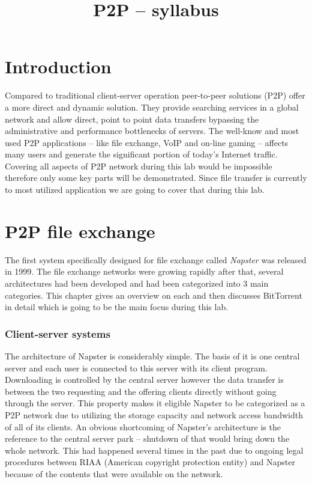 \documentclass[a4paper]{article}
\title{P2P – syllabus}
\author{}
\date{}
\begin{document}
\maketitle

\tableofcontents

\section{Introduction}

Compared to traditional client-server operation peer-to-peer solutions (P2P) offer a more direct and dynamic
solution. They provide searching services in a global network and allow direct, point to point data transfers
bypassing the administrative and performance bottlenecks of servers.
The well-know and most used P2P applications -- like file exchange, VoIP and on-line gaming -- affects many users and
generate the significant portion of today's Internet traffic. Covering all aspects of P2P network during this lab would
be impossible therefore only some key parts will be demonstrated. Since file transfer is currently to most utilized
application we are going to cover that during this lab.

\section{P2P file exchange}

The first system specifically designed for file exchange called \emph{Napster} was released in 1999. The file exchange
networks were growing rapidly after that, several architectures had been developed and had been categorized  into 3
main categories. This chapter gives an overview on each and then discusses BitTorrent in detail which is going to be
the main focus during this lab.

\subsubsection{Client-server systems}

The architecture of Napster is considerably simple. The basis of it is one central server and each user is connected to
this server with its client program. Downloading is controlled by the central server however the data transfer is
between the two requesting and the offering clients directly without going through the server. This property makes it
eligible Napster to be categorized as a P2P network due to utilizing the storage capacity and network access bandwidth
of all of its clients. An obvious shortcoming of Napster's architecture is the reference to the central server park --
shutdown of that would bring down the whole network. This had happened several times in the past due to ongoing legal
procedures between RIAA (American copyright protection entity) and Napster because of the contents that were available
on the network.
\end{document}
